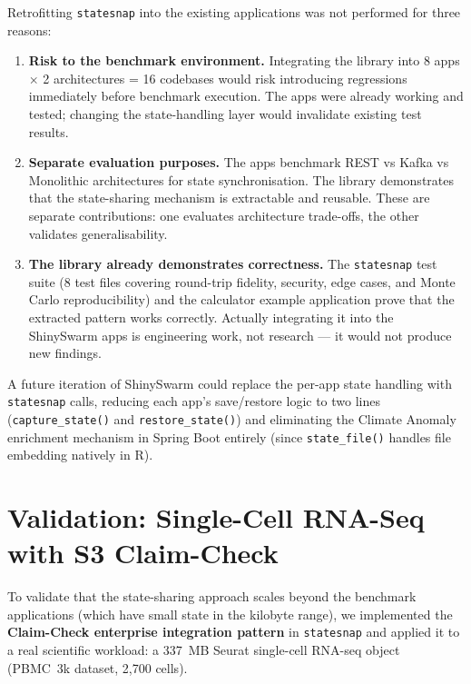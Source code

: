 \documentclass[11pt,a4paper]{article}
\begin{document}
Retrofitting \texttt{statesnap} into the existing applications was not performed
for three reasons:

\begin{enumerate}[nosep]
  \item \textbf{Risk to the benchmark environment.} Integrating the library
        into 8 apps $\times$ 2 architectures = 16 codebases would risk
        introducing regressions immediately before benchmark execution. The
        apps were already working and tested; changing the state-handling layer
        would invalidate existing test results.
  \item \textbf{Separate evaluation purposes.} The apps benchmark REST vs Kafka
        vs Monolithic architectures for state synchronisation. The library
        demonstrates that the state-sharing mechanism is extractable and
        reusable. These are separate contributions: one evaluates architecture
        trade-offs, the other validates generalisability.
  \item \textbf{The library already demonstrates correctness.} The
        \texttt{statesnap} test suite (8 test files covering round-trip
        fidelity, security, edge cases, and Monte Carlo reproducibility) and
        the calculator example application prove that the extracted pattern
        works correctly. Actually integrating it into the ShinySwarm apps is
        engineering work, not research --- it would not produce new findings.
\end{enumerate}

A future iteration of ShinySwarm could replace the per-app state handling with
\texttt{statesnap} calls, reducing each app's save/restore logic to two lines
(\texttt{capture\_state()} and \texttt{restore\_state()}) and eliminating the
Climate Anomaly enrichment mechanism in Spring Boot entirely (since
\texttt{state\_file()} handles file embedding natively in R).

\section{Validation: Single-Cell RNA-Seq with S3 Claim-Check}

To validate that the state-sharing approach scales beyond the benchmark
applications (which have small state in the kilobyte range), we implemented the
\textbf{Claim-Check enterprise integration pattern} in \texttt{statesnap} and
applied it to a real scientific workload: a 337~MB Seurat single-cell RNA-seq
object (PBMC~3k dataset, 2,700 cells).
\end{document}
